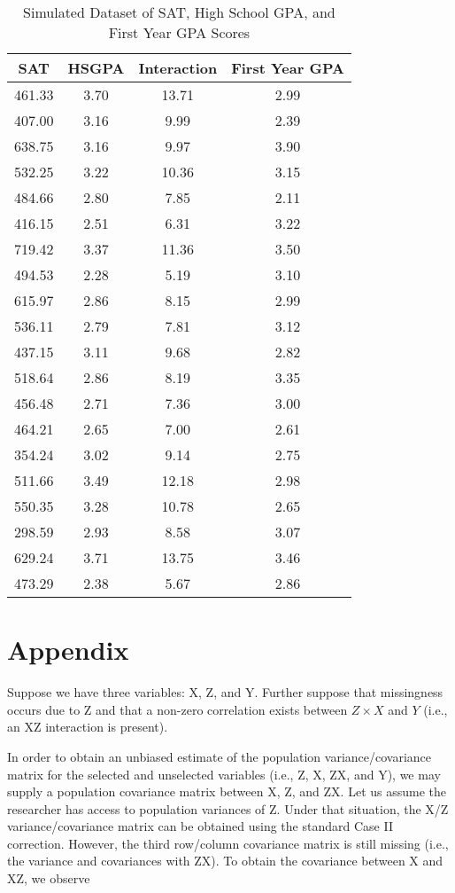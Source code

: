 \documentclass[doc, babel,english]{apa}%
\begin{document}
\begin{table}[ht]
\caption{Simulated Dataset of SAT, High School GPA, and First Year GPA Scores} 
\label{tab:combs}
\begin{tabular}{cccc}
  \hline
SAT & HSGPA & Interaction & First Year GPA \\ 
  \hline
461.33 & 3.70 & 13.71 & 2.99 \\ 
  407.00 & 3.16 & 9.99 & 2.39 \\ 
  638.75 & 3.16 & 9.97 & 3.90 \\ 
  532.25 & 3.22 & 10.36 & 3.15 \\ 
  484.66 & 2.80 & 7.85 & 2.11 \\ 
  416.15 & 2.51 & 6.31 & 3.22 \\ 
  719.42 & 3.37 & 11.36 & 3.50 \\ 
  494.53 & 2.28 & 5.19 & 3.10 \\ 
  615.97 & 2.86 & 8.15 & 2.99 \\ 
  536.11 & 2.79 & 7.81 & 3.12 \\ 
  437.15 & 3.11 & 9.68 & 2.82 \\ 
  518.64 & 2.86 & 8.19 & 3.35 \\ 
  456.48 & 2.71 & 7.36 & 3.00 \\ 
  464.21 & 2.65 & 7.00 & 2.61 \\ 
  354.24 & 3.02 & 9.14 & 2.75 \\ 
  511.66 & 3.49 & 12.18 & 2.98 \\ 
  550.35 & 3.28 & 10.78 & 2.65 \\ 
  298.59 & 2.93 & 8.58 & 3.07 \\ 
  629.24 & 3.71 & 13.75 & 3.46 \\ 
  473.29 & 2.38 & 5.67 & 2.86 \\ 
   \hline
\end{tabular}
\end{table}

\section{Appendix}
Suppose we have three variables: X, Z, and Y. Further suppose that missingness occurs due to Z and that a non-zero correlation exists between $Z\times X$ and $Y$ (i.e., an XZ interaction is present). 

In order to obtain an unbiased estimate of the population variance/covariance matrix for the selected and unselected variables (i.e., Z, X, ZX, and Y), we may supply a population covariance matrix between X, Z, and ZX.  Let us assume the researcher has access to population variances of Z. Under that situation, the X/Z variance/covariance matrix can be obtained using the standard Case II correction. However, the third row/column covariance matrix is still missing (i.e., the variance and covariances with ZX). To obtain the covariance between X and XZ, we observe
\end{document}

